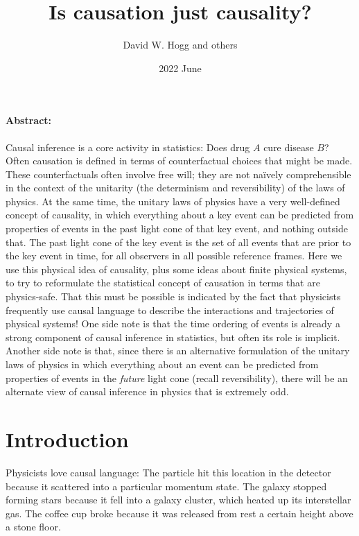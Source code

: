 \documentclass[12pt]{article}
\title{\bfseries%
  Is causation just causality?}
\author{%
  David W. Hogg and others}
\date{2022 June}
\begin{document}
\maketitle\thispagestyle{empty}

\paragraph{Abstract:}
Causal inference is a core activity in statistics:
Does drug $A$ cure disease $B$?
Often causation is defined in terms of counterfactual choices that might be made.
These counterfactuals often involve free will; they are not na\"ively comprehensible in the context of the unitarity (the determinism and reversibility) of the laws of physics.
At the same time, the unitary laws of physics have a very well-defined concept of causality, in which everything about a key event can be predicted from properties of events in the past light cone of that key event, and nothing outside that.
The past light cone of the key event is the set of all events that are prior to the key event in time, for all observers in all possible reference frames.
Here we use this physical idea of causality, plus some ideas about finite physical systems, to try to reformulate the statistical concept of causation in terms that are physics-safe.
That this must be possible is indicated by the fact that physicists frequently use causal language to describe the interactions and trajectories of physical systems!
One side note is that the time ordering of events is already a strong component of causal inference in statistics, but often its role is implicit.
Another side note is that, since there is an alternative formulation of the unitary laws of physics in which everything about an event can be predicted from properties of events in the \emph{future} light cone (recall reversibility), there will be an alternate view of causal inference in physics that is extremely odd.

\section{Introduction}

Physicists love causal language:
The particle hit this location in the detector because it scattered into a particular momentum state.
The galaxy stopped forming stars because it fell into a galaxy cluster, which heated up its interstellar gas.
The coffee cup broke because it was released from rest a certain height above a stone floor.
\end{document}
